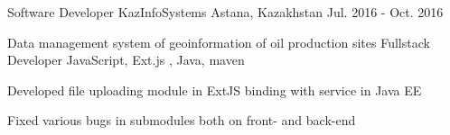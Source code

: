 \begin{cventries}
\cventry
    {Software Developer} %
    {KazInfoSystems} %
    {Astana, Kazakhstan} %
    {Jul. 2016 - Oct. 2016} %
    {%
        \cvproject %
            {Data management system of geoinformation of oil production sites} %
            {Fullstack Developer} %
            {JavaScript, Ext.js , Java, maven}%
            {
                \begin{cvitems}
                    \item {Developed file uploading module in ExtJS binding with service in Java EE}
                    \item {Fixed various bugs in submodules both on front- and back-end}
                \end{cvitems}
            }
    }
\end{cventries}
